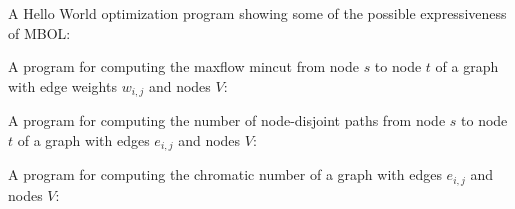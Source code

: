 \documentclass{article}
\begin{document}
A Hello World optimization program showing some of the possible expressiveness of MBOL:


A program for computing the maxflow mincut from node $s$ to node $t$ of a graph with edge weights $w_{i,j}$ and nodes $V$:


A program for computing the number of node-disjoint paths from node $s$ to node $t$ of a graph with edges $e_{i,j}$ and nodes $V$:


A program for computing the chromatic number of a graph with edges $e_{i,j}$ and nodes $V$:

\end{document}
